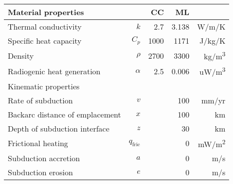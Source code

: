 \begin{tabularx}{\textwidth}{X r r r r}
\toprule
  Material properties & & CC & ML & \\
\midrule
  Thermal conductivity & $k$ & 2.7 & 3.138 & \si{W/m/K} \\
  Specific heat capacity & $C_p$ & 1000 & 1171 & \si{J/kg/K} \\
  Density & $\rho$ & 2700 & 3300 & \si{kg/m^3} \\
  Radiogenic heat generation & $\alpha$ & 2.5 & 0.006 & \si{uW/m^3} \\
\midrule
  \multicolumn{5}{l}{Kinematic properties \citep[][subduction model]{Royden1993a}} \\
\midrule
  Rate of subduction & $v$ & \multicolumn{2}{r}{100} & \si{mm/yr} \\
  Backarc distance of emplacement & $x$ & \multicolumn{2}{r}{100} & \si{km} \\
  Depth of subduction interface & $z$ & \multicolumn{2}{r}{30} & \si{km} \\
  Frictional heating & $q_\textrm{fric}$ & \multicolumn{2}{r}{0} & \si{mW/m^2} \\
  Subduction accretion & $a$ &  \multicolumn{2}{r}{0} & \si{m/s} \\
  Subduction erosion & $e$ & \multicolumn{2}{r}{0} & \si{m/s} \\
\bottomrule
\end{tabularx}
